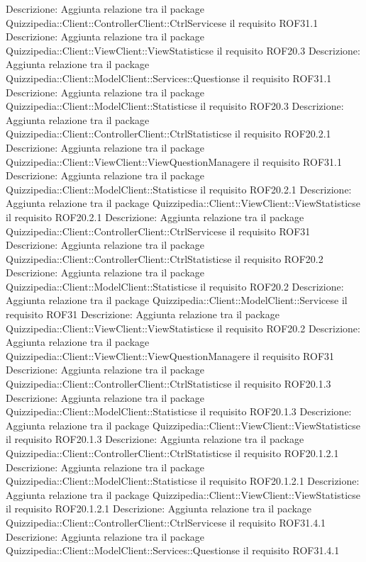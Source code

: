Descrizione: Aggiunta relazione tra il package Quizzipedia::Client::ControllerClient::CtrlServicese il requisito ROF31.1 
Descrizione: Aggiunta relazione tra il package Quizzipedia::Client::ViewClient::ViewStatisticse il requisito ROF20.3 
Descrizione: Aggiunta relazione tra il package Quizzipedia::Client::ModelClient::Services::Questionse il requisito ROF31.1 
Descrizione: Aggiunta relazione tra il package Quizzipedia::Client::ModelClient::Statisticse il requisito ROF20.3 
Descrizione: Aggiunta relazione tra il package Quizzipedia::Client::ControllerClient::CtrlStatisticse il requisito ROF20.2.1 
Descrizione: Aggiunta relazione tra il package Quizzipedia::Client::ViewClient::ViewQuestionManagere il requisito ROF31.1 
Descrizione: Aggiunta relazione tra il package Quizzipedia::Client::ModelClient::Statisticse il requisito ROF20.2.1 
Descrizione: Aggiunta relazione tra il package Quizzipedia::Client::ViewClient::ViewStatisticse il requisito ROF20.2.1 
Descrizione: Aggiunta relazione tra il package Quizzipedia::Client::ControllerClient::CtrlServicese il requisito ROF31 
Descrizione: Aggiunta relazione tra il package Quizzipedia::Client::ControllerClient::CtrlStatisticse il requisito ROF20.2 
Descrizione: Aggiunta relazione tra il package Quizzipedia::Client::ModelClient::Statisticse il requisito ROF20.2 
Descrizione: Aggiunta relazione tra il package Quizzipedia::Client::ModelClient::Servicese il requisito ROF31 
Descrizione: Aggiunta relazione tra il package Quizzipedia::Client::ViewClient::ViewStatisticse il requisito ROF20.2 
Descrizione: Aggiunta relazione tra il package Quizzipedia::Client::ViewClient::ViewQuestionManagere il requisito ROF31 
Descrizione: Aggiunta relazione tra il package Quizzipedia::Client::ControllerClient::CtrlStatisticse il requisito ROF20.1.3 
Descrizione: Aggiunta relazione tra il package Quizzipedia::Client::ModelClient::Statisticse il requisito ROF20.1.3 
Descrizione: Aggiunta relazione tra il package Quizzipedia::Client::ViewClient::ViewStatisticse il requisito ROF20.1.3 
Descrizione: Aggiunta relazione tra il package Quizzipedia::Client::ControllerClient::CtrlStatisticse il requisito ROF20.1.2.1 
Descrizione: Aggiunta relazione tra il package Quizzipedia::Client::ModelClient::Statisticse il requisito ROF20.1.2.1 
Descrizione: Aggiunta relazione tra il package Quizzipedia::Client::ViewClient::ViewStatisticse il requisito ROF20.1.2.1 
Descrizione: Aggiunta relazione tra il package Quizzipedia::Client::ControllerClient::CtrlServicese il requisito ROF31.4.1 
Descrizione: Aggiunta relazione tra il package Quizzipedia::Client::ModelClient::Services::Questionse il requisito ROF31.4.1 

